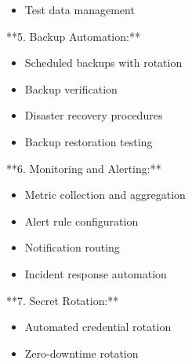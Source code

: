 \documentclass[11pt,a4paper]{article}
\begin{document}
\begin{itemize}
\item Test data management
\end{itemize}

**5. Backup Automation:**

\begin{itemize}
\item Scheduled backups with rotation
\end{itemize}

\begin{itemize}
\item Backup verification
\end{itemize}

\begin{itemize}
\item Disaster recovery procedures
\end{itemize}

\begin{itemize}
\item Backup restoration testing
\end{itemize}

**6. Monitoring and Alerting:**

\begin{itemize}
\item Metric collection and aggregation
\end{itemize}

\begin{itemize}
\item Alert rule configuration
\end{itemize}

\begin{itemize}
\item Notification routing
\end{itemize}

\begin{itemize}
\item Incident response automation
\end{itemize}

**7. Secret Rotation:**

\begin{itemize}
\item Automated credential rotation
\end{itemize}

\begin{itemize}
\item Zero-downtime rotation
\end{itemize}
\end{document}
